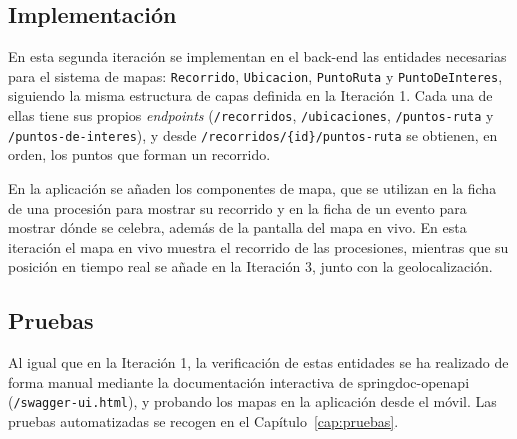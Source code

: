 \subsection{Implementación}

En esta segunda iteración se implementan en el back-end las entidades necesarias para el sistema de mapas: \texttt{Recorrido}, \texttt{Ubicacion}, \texttt{PuntoRuta} y \texttt{PuntoDeInteres}, siguiendo la misma estructura de capas definida en la Iteración 1. Cada una de ellas tiene sus propios \emph{endpoints} (\texttt{/recorridos}, \texttt{/ubicaciones}, \texttt{/puntos-ruta} y \texttt{/puntos-de-interes}), y desde \texttt{/recorridos/\{id\}/puntos-ruta} se obtienen, en orden, los puntos que forman un recorrido.

En la aplicación se añaden los componentes de mapa, que se utilizan en la ficha de una procesión para mostrar su recorrido y en la ficha de un evento para mostrar dónde se celebra, además de la pantalla del mapa en vivo. En esta iteración el mapa en vivo muestra el recorrido de las procesiones, mientras que su posición en tiempo real se añade en la Iteración 3, junto con la geolocalización.


\subsection{Pruebas}

Al igual que en la Iteración 1, la verificación de estas entidades se ha realizado de forma manual mediante la documentación interactiva de springdoc-openapi (\texttt{/swagger-ui.html}), y probando los mapas en la aplicación desde el móvil. Las pruebas automatizadas se recogen en el Capítulo~\ref{cap:pruebas}.
